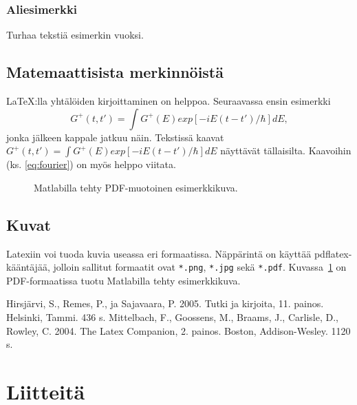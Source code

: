 \documentclass[12pt,a4paper,finnish]{vendor/tutthesis}
\begin{document}
\subsection{Aliesimerkki}

Turhaa tekstiä esimerkin vuoksi.

\section{Matemaattisista merkinnöistä}

\LaTeX:lla yhtälöiden kirjoittaminen on helppoa. Seuraavassa ensin esimerkki
\begin{equation}
  \label{eq:fourier}
  G^+(t,t')= \int G^+(E) exp[-iE(t-t')/\hbar] dE,
\end{equation}
jonka jälkeen kappale jatkuu näin.
Tekstissä kaavat $G^+(t,t')= \int G^+(E) exp[-iE(t-t')/\hbar] dE$ näyttävät
tällaisilta. Kaavoihin (ks. \ref{eq:fourier}) on myös helppo viitata.

%

\begin{figure}[t]
\begin{center}
\end{center}
\caption{Matlabilla tehty PDF-muotoinen esimerkkikuva.}
\label{fig:esimKuva}
\end{figure}

\section{Kuvat}

Latexiin voi tuoda kuvia useassa eri formaatissa.
Näppärintä on käyttää pdflatex-kääntäjää, jolloin
sallitut formaatit ovat \verb+*.png+, \verb+*.jpg+
sekä \verb+*.pdf+. Kuvassa~\ref{fig:esimKuva} on
PDF-formaatissa tuotu Matlabilla tehty
esimerkkikuva.

\newpage
{} %
\renewcommand{\bibname}{Lähteet}
\begin{thebibliography}{99}
 Hirsjärvi, S., Remes, P., ja Sajavaara, P. 2005. Tutki ja
  kirjoita, 11. painos. Helsinki, Tammi. 436 s.
 Mittelbach, F., Goossens, M., Braams, J.,
Carlisle, D., Rowley, C. 2004. The Latex Companion, 2. painos. Boston, Addison-Wesley. 1120 s.

\end{thebibliography}

%
%

\appendix
\renewcommand{\chaptername}{Liite}

\chapter{Liitteitä}
\end{document}

